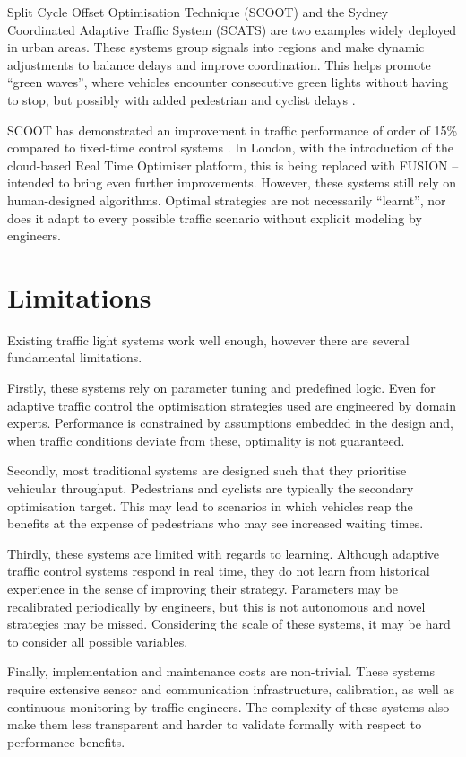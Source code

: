 \documentclass[a4paper]{report}
\begin{document}
Split Cycle Offset Optimisation Technique (SCOOT) and the Sydney Coordinated Adaptive Traffic System (SCATS) are two examples widely deployed in urban areas. These systems group signals into regions and make dynamic adjustments to balance delays and improve coordination. This helps promote ``green waves'', where vehicles encounter consecutive green lights without having to stop, but possibly with added pedestrian and cyclist delays \cite{CesmeUrbanikII2021}.

SCOOT has demonstrated an improvement in traffic performance of order of 15\% compared to fixed-time control systems \cite{ITS2012}. In London, with the introduction of the cloud-based Real Time Optimiser platform, this is being replaced with FUSION -- intended to bring even further improvements. However, these systems still rely on human-designed algorithms. Optimal strategies are not necessarily ``learnt'', nor does it adapt to every possible traffic scenario without explicit modeling by engineers.

\section{Limitations}

Existing traffic light systems work well enough, however there are several fundamental limitations.

Firstly, these systems rely on parameter tuning and predefined logic. Even for adaptive traffic control the optimisation strategies used are engineered by domain experts. Performance is constrained by assumptions embedded in the design and, when traffic conditions deviate from these, optimality is not guaranteed.

Secondly, most traditional systems are designed such that they prioritise vehicular throughput. Pedestrians and cyclists are typically the secondary optimisation target. This may lead to scenarios in which vehicles reap the benefits at the expense of pedestrians who may see increased waiting times.

Thirdly, these systems are limited with regards to learning. Although adaptive traffic control systems respond in real time, they do not learn from historical experience in the sense of improving their strategy. Parameters may be recalibrated periodically by engineers, but this is not autonomous and novel strategies may be missed. Considering the scale of these systems, it may be hard to consider all possible variables.

Finally, implementation and maintenance costs are non-trivial. These systems require extensive sensor and communication infrastructure, calibration, as well as continuous monitoring by traffic engineers. The complexity of these systems also make them less transparent and harder to validate formally with respect to performance benefits.
\end{document}
